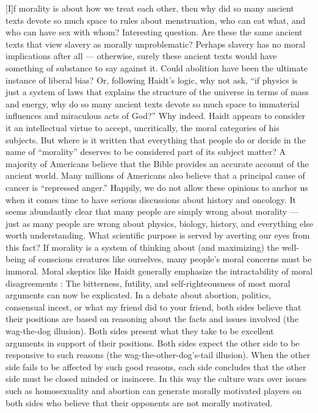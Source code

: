 \documentclass[a4paper,14pt]{extarticle}
\begin{document}
[I]f morality is about how we treat each other, then why did so many ancient texts devote so much space to rules about menstruation, who can eat what, and who can have sex with whom?
Interesting question.
Are these the same ancient texts that view slavery as morally unproblematic?
Perhaps slavery has no moral implications after all --- otherwise, surely these ancient texts would have something of substance to say against it.
Could abolition have been the ultimate instance of liberal bias?
Or, following Haidt's logic, why not ask, ``if physics is just a system of laws that explains the structure of the universe in terms of mass and energy, why do so many ancient texts devote so much space to immaterial influences and miraculous acts of God?''
Why indeed.
Haidt appears to consider it an intellectual virtue to accept, uncritically, the moral categories of his subjects.
But where is it written that everything that people do or decide in the name of ``morality'' deserves to be considered part of its subject matter?
A majority of Americans believe that the Bible provides an accurate account of the ancient world.
Many millions of Americans also believe that a principal cause of cancer is ``repressed anger.''
Happily, we do not allow these opinions to anchor us when it comes time to have serious discussions about history and oncology.
It seems abundantly clear that many people are simply wrong about morality --- just as many people are wrong about physics, biology, history, and everything else worth understanding.
What scientific purpose is served by averting our eyes from this fact?
If morality is a system of thinking about (and maximizing) the well-being of conscious creatures like ourselves, many people's moral concerns must be immoral.
Moral skeptics like Haidt generally emphasize the intractability of moral disagreements :
The bitterness, futility, and self-righteousness of most moral arguments can now be explicated.
In a debate about abortion, politics, consensual incest, or what my friend did to your friend, both sides believe that their positions are based on reasoning about the facts and issues involved (the wag-the-dog illusion).
Both sides present what they take to be excellent arguments in support of their positions.
Both sides expect the other side to be responsive to such reasons (the wag-the-other-dog's-tail illusion).
When the other side fails to be affected by such good reasons, each side concludes that the other side must be closed minded or insincere.
In this way the culture wars over issues such as homosexuality and abortion can generate morally motivated players on both sides who believe that their opponents are not morally motivated.
\end{document}
